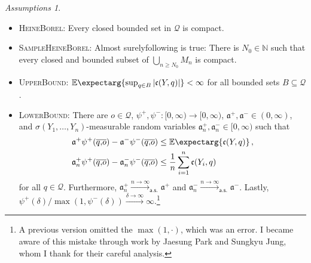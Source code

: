 \documentclass{scrartcl}
\renewcommand{\subset}{\subseteq}
\newcommand{\Ex}{\E\expectarg}
\newcommand*{\mc}[1]{\mathcal{#1}}
\newcommand*{\ms}[1]{\mathsf{#1}}
\newcommand*{\mf}[1]{\mathfrak{#1}}
\newcommand{\N}{\mathbb{N}}
\newcommand{\equationComma}{\, ,}
\newcommand{\eqcm}{\equationComma}
\theoremstyle{plain}\newtheorem{theorem}{Theorem}[section]
\theoremstyle{definition}
\theoremstyle{remark}
\newtheorem{assumptions}[theorem]{Assumptions}
\providecommand{\DIFaddtex}[1]{{\protect\color{blue}\uwave{#1}}} %
\providecommand{\DIFaddbegin}{} %
\providecommand{\DIFaddend}{} %
\providecommand{\DIFadd}[1]{\texorpdfstring{\DIFaddtex{#1}}{#1}} %
\newcommand{\DIFaddincludegraphics}[2][]{{\color{blue}\fbox{\DIFOincludegraphics[#1]{#2}}}} %
\DeclareRobustCommand{\DIFaddbegin}{\DIFOaddbegin \let\includegraphics\DIFaddincludegraphics} %
\DeclareRobustCommand{\DIFaddend}{\DIFOaddend \let\includegraphics\DIFOincludegraphics} %
\begin{document}
\begin{assumptions}\mbox{ }
\begin{itemize}
	\item \textsc{HeineBorel}: Every closed bounded set in $\mc Q$ is compact.
	\item \textsc{SampleHeineBorel}: Almost surely\DIFaddbegin \DIFadd{, the }\DIFaddend following is true: There is $N_0\in\N$ such that every closed and bounded subset of $\bigcup_{n\geq N_0} M_n$ is compact.
	\item \textsc{UpperBound}: $\Ex{\sup_{q\in B} \abs{\mf c(Y,q)}} < \infty$ for all bounded sets $B\subset\mc Q$.
	\item \textsc{LowerBound}: There are $o\in\mc Q$, $\psi^+, \psi^- \colon [0,\infty) \to [0,\infty)$, $\mf a^+, \mf a^- \in(0,\infty)$, and $\sigma(Y_1, \dots, Y_n)$-measurable random variables $\mf a^+_n, \mf a^-_n \in[0,\infty)$ such that 
	\begin{align*}
		\mf a^+ \psi^+(\ol qo) - \mf a^- \psi^-(\ol qo) &\leq \Ex{\mf c(Y, q)}
		\eqcm\\
		\mf a^+_n \psi^+(\ol qo) - \mf a^-_n \psi^-(\ol qo) &\leq \frac{1}n \sum_{i=1}^n \mf c(Y_i, q)
	\end{align*}
	for all $q\in\mc Q$. Furthermore, $\mf a^+_n\xrightarrow{n\to\infty}_{\ms{a.s.}}\mf a^+$ and $\mf a^-_n\xrightarrow{n\to\infty}_{\ms{a.s.}}\mf a^-$. Lastly, $\psi^+(\delta)/\max(1, \psi^-(\delta))\xrightarrow{\delta\to\infty}\infty$.\footnote{A previous version omitted the $\max(1,\cdot)$, which was an error. I became aware of this mistake through work by Jaesung Park and Sungkyu Jung, whom I thank for their careful analysis.}
	\end{itemize}
\end{assumptions}
\end{document}

